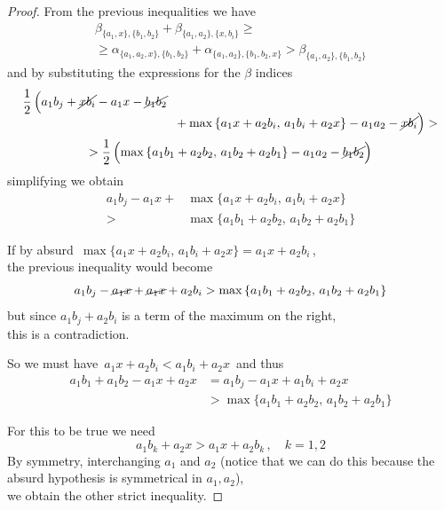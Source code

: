 \documentclass[./main.tex]{subfiles}
\begin{document}
\begin{proof}
    From the previous inequalities we have
    \begin{multline*}
        \beta_{\{a_1,x\},\{b_1,b_2\}} + \beta_{\{a_1,a_2\},\{x,b_i\}} \geq \\[2pt]
        \geq \alpha_{\{a_1,a_2,x\},\{b_1,b_2\}} + \alpha_{\{a_1,a_2\},\{b_1,b_2,x\}} > \beta_{\{a_1,a_2\},\{b_1,b_2\}}
    \end{multline*} 
    and by substituting the expressions for the $\beta$ indices
    \begin{gather*}
        \begin{multlined}[\linewidth-\multlinegap]
            \frac{1}{2}\, \Bigl( a_1 b_j + \cancel{x b_i} - a_1 x - \cancel{b_1 b_2} \\[-5pt]
            + \max {\{ a_1 x + a_2 b_i,\, a_1 b_i + a_2 x \}} - a_1 a_2 - \cancel{x b_i} \Bigr) >
        \end{multlined} \\
        > \frac{1}{2}\, \Bigl( \max {\{ a_1 b_1 + a_2 b_2,\, a_1 b_2 + a_2 b_1 \}} - a_1 a_2 - \cancel{b_1 b_2} \Bigr)
    \end{gather*}
    simplifying we obtain
    \begin{align*}
        a_1 b_j - a_1 x {}+{}& \max {\{ a_1 x + a_2 b_i,\, a_1 b_i + a_2 x \}} \\
        {}>{}& \max {\{ a_1 b_1 + a_2 b_2,\, a_1 b_2 + a_2 b_1 \}}
    \end{align*}
    
    If by absurd $\, \max {\{ a_1 x + a_2 b_i,\, a_1 b_i + a_2 x \}} = a_1 x + a_2 b_i \,$, \\[2pt]
    the previous inequality would become
    \[ a_1 b_j - \cancel{a_1 x} + \cancel{a_1 x} + a_2 b_i > \max {\{ a_1 b_1 + a_2 b_2,\, a_1 b_2 + a_2 b_1 \}} \]
    but since $a_1 b_j + a_2 b_i$ is a term of the maximum on the right, \\
    this is a contradiction. \absurd
    
    So we must have $\, a_1 x + a_2 b_i < a_1 b_i + a_2 x \,$ and thus
    \begin{align*}
        a_1 b_1 + a_1 b_2 - a_1 x + a_2 x &= a_1 b_j - a_1 x + a_1 b_i + a_2 x \\
        &> \max {\{ a_1 b_1 + a_2 b_2,\, a_1 b_2 + a_2 b_1 \}}
    \end{align*}
    
    For this to be true we need
    \[ a_1 b_k + a_2 x > a_1 x + a_2 b_k\,, \quad k = 1,2 \]
    By symmetry, interchanging $a_1$ and $a_2$ (notice that we can do this because the absurd hypothesis is symmetrical in $a_1,a_2$), \\
    \bsp we obtain the other strict inequality. \absurd \qedhere
\end{proof}
\end{document}
